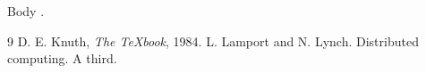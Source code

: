 \documentclass{article}
\begin{document}
Body \cite{knuth} \cite{ll}.
\begin{thebibliography}{9}
 D. E. Knuth, \emph{The \TeX book}, 1984.
 L. Lamport and N. Lynch.
\newblock Distributed computing.
 A third.
\end{thebibliography}
\clearpage
\cite{knuth}
\cite{ll,knuth}
\cite[p.~3]{knuth}
\cite{third}
\cite{knuth,third}
\end{document}
